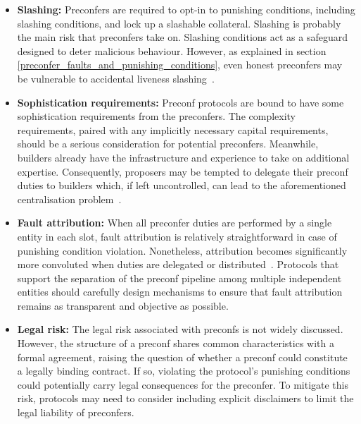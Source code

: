 \documentclass[a4paper]{article}
\theoremstyle{boldstyle}
\begin{document}
    \begin{itemize}
        \item \textbf{Slashing:}
        Preconfers are required to opt-in to punishing conditions, including slashing conditions, and lock up a slashable collateral. Slashing is probably the main risk that preconfers take on. Slashing conditions act as a safeguard designed to deter malicious behaviour. However, as explained in section \ref{preconfer_faults_and_punishing_conditions}, even honest preconfers may be vulnerable to accidental liveness slashing~\cite{W:AvoidingAccidentalLivenessFaultsforBasedPreconfs}.

        
        \item \textbf{Sophistication requirements:} 
        Preconf protocols are bound to have some sophistication requirements from the preconfers. The complexity requirements, paired with any implicitly necessary capital requirements, should be a serious consideration for potential preconfers. Meanwhile, builders already have the infrastructure and experience to take on additional expertise. Consequently, proposers may be tempted to delegate their preconf duties to builders which, if left uncontrolled, can lead to the aforementioned centralisation problem~\cite{W:Towardsanimplementationofbasedpreconfirmationsleveragingrestaking,W:AnalysingExpectedProposerRevenuefromPreconfirmations}.
        
        \item \textbf{Fault attribution:}
        When all preconfer duties are performed by a single entity in each slot, fault attribution is relatively straightforward in case of punishing condition violation. Nonetheless, attribution becomes significantly more convoluted when duties are delegated or distributed~\cite{W:DelegationinBolt:OutsourcingSophisticationWhilePreservingDecentralization}. Protocols that support the separation of the preconf pipeline among multiple independent entities should carefully design mechanisms to ensure that fault attribution remains as transparent and objective as possible.
        
        \item \textbf{Legal risk:} 
        The legal risk associated with preconfs is not widely discussed. However, the structure of a preconf shares common characteristics with a formal agreement, raising the question of whether a preconf could constitute a legally binding contract. If so, violating the protocol's punishing conditions could potentially carry legal consequences for the preconfer. To mitigate this risk, protocols may need to consider including explicit disclaimers to limit the legal liability of preconfers.

    \end{itemize}
    
\end{document}
